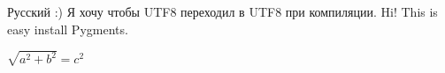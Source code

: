 \documentclass[a4paper]{article}
\begin{document}
Русский :) Я хочу чтобы UTF8 переходил в UTF8 при компиляции.
Hi! This is easy install Pygments.

$\sqrt{a^2+b^2}=c^2$
\end{document}
